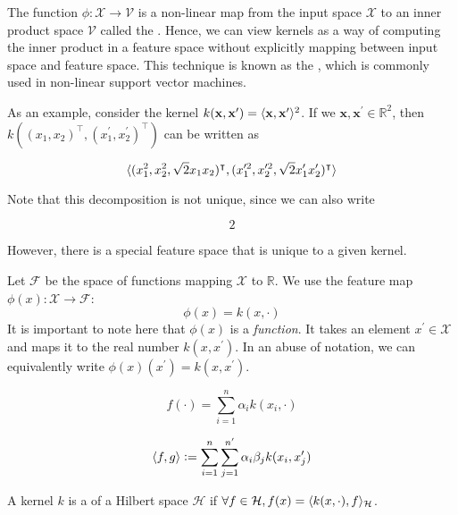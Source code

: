 The function $\phi : \mathcal{X} \to \mathcal{V}$ is a non-linear map from the input space $\mathcal{X}$ to an inner product space $\mathcal{V}$ called the . Hence, we can view kernels as a way of computing the inner product in a feature space without explicitly mapping between input space and feature space. This technique is known as the , which is commonly used in non-linear support vector machines.

As an example, consider the kernel $k(\mathbf{x}, \mathbf{x}^\prime) = \langle\mathbf{x}, \mathbf{x}^\prime\rangle^2$. If we $\mathbf{x}, \mathbf{x}^\prime \in \mathbb{R}^2$, then $k((x_1, x_2)^\intercal, (x_1^\prime, x_2^\prime)^\intercal)$ can be written as

\begin{equation}
\langle(x_1^2, x_2^2, \sqrt{2} x_1 x_2)^\intercal, (x_1^{\prime 2}, x_2^{\prime 2}, \sqrt{2} x_1^\prime x_2^\prime)^\intercal\rangle
\end{equation}

Note that this decomposition is not unique, since we can also write

\begin{equation}
2
\end{equation}

However, there is a special feature space that is unique to a given kernel. 

Let $\mathcal{F}$ be the space of functions mapping $\mathcal{X}$ to $\mathbb{R}$. We use the feature map $\phi(x) : \mathcal{X} \to \mathcal{F}$:
\begin{equation}
	\phi(x) = k(x, \cdot)
\end{equation}
It is important to note here that $\phi(x)$ is a \emph{function}. It takes an element $x^\prime \in \mathcal{X}$ and maps it to the real number $k(x, x^\prime)$. In an abuse of notation, we can equivalently write $\phi(x)(x^\prime) = k(x, x^\prime)$.


\begin{equation}
	f(\cdot) = \sum_{i=1}^n \alpha_i k(x_i, \cdot)
\end{equation}

\begin{equation}
	\langle f, g\rangle \vcentcolon= \sum_{i=1}^n \sum_{j=1}^{n^\prime} \alpha_i \beta_j k(x_i, x_j^\prime)
\end{equation}

\begin{definition}
	A kernel $k$ is a  of a Hilbert space $\mathcal{H}$ if $\forall f \in \mathcal{H}, f(x) = \langle k(x, \cdot), f\rangle_\mathcal{H}$.
\end{definition}

